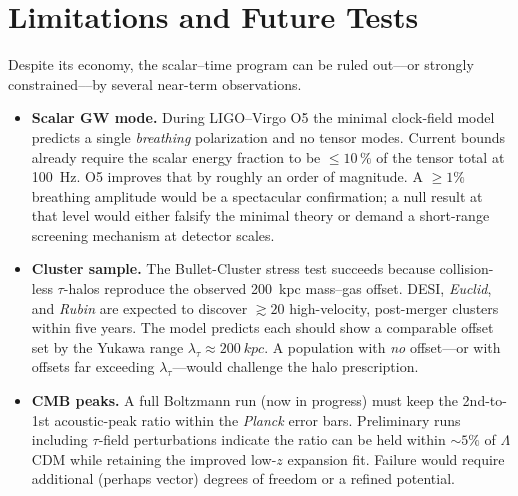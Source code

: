 \chapter{Limitations and Future Tests}

Despite its economy, the scalar–time program can be ruled out––or strongly
constrained––by several near-term observations.

\begin{itemize}
  \item \textbf{Scalar GW mode.}  During LIGO–Virgo O5 the minimal clock-field
        model predicts a single \emph{breathing} polarization and no tensor
        modes.  Current bounds already require the scalar energy fraction to be
        $\le 10\,\%$ of the tensor total at \SI{100}{Hz}.  O5 improves that by
        roughly an order of magnitude.  A $\ge1\%$ breathing amplitude would be
        a spectacular confirmation; a null result at that level would either
        falsify the minimal theory or demand a short-range screening mechanism
        at detector scales.

  \item \textbf{Cluster sample.}  The Bullet-Cluster stress test succeeds
        because collision-less $\tau$-halos reproduce the observed
        \SI{200}{kpc} mass–gas offset.  DESI, \textit{Euclid}, and
        \textit{Rubin} are expected to discover $\gtrsim20$ high-velocity,
        post-merger clusters within five years.  The model predicts each should
        show a comparable offset set by the Yukawa range
        $\lambda_{\tau}\!\approx\!\SI{200}{kpc}$.  A population with \emph{no}
        offset—or with offsets far exceeding $\lambda_{\tau}$—would challenge
        the halo prescription.

  \item \textbf{CMB peaks.}  A full Boltzmann run (now in progress) must keep
        the 2nd-to-1st acoustic-peak ratio within the \textit{Planck} error
        bars.  Preliminary runs including $\tau$-field perturbations indicate
        the ratio can be held within $\sim5\%$ of \(\Lambda\)CDM while
        retaining the improved low-$z$ expansion fit.  Failure would require
        additional (perhaps vector) degrees of freedom or a refined potential.
\end{itemize}

